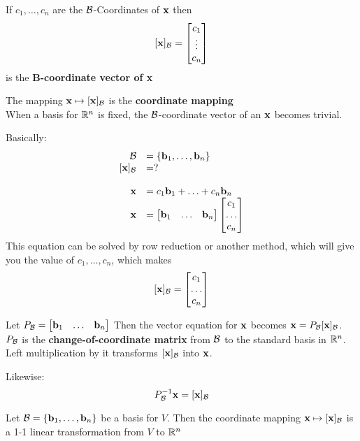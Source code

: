 \documentclass{report}
\begin{document}
If $c_1, \ldots, c_n$ are the $\mathcal{B}$-Coordinates of $\mathbf{x}$ then \[
[\mathbf{x}]_{\mathcal{B}} = \begin{bmatrix}
    c_1 \\ \vdots \\ c_n
\end{bmatrix}
\]
is the \textbf{B-coordinate vector of x}

The mapping $\mathbf{x} \mapsto [\mathbf{x}]_{\mathcal{B}}$ is the \textbf{coordinate mapping}
\\

When a basis for $\mathbb{R}^n$ is fixed, the $\mathcal{B}$-coordinate vector of an $\mathbf{x}$ becomes trivial.

Basically:
\[
\begin{array}{rlr}
    \BB &= \{\bb_1, \ldots, \bb_n\} \\
    \cB &= ?
    \\\\
    \xx &= c_1 \bb_1 + \ldots + c_n \bb_n \\ 
    \xx &= \begin{bmatrix}
        \bb_1 & \ldots & \bb_n
    \end{bmatrix} 
    \begin{bmatrix}
        c_1 \\ \ldots \\ c_n
    \end{bmatrix}
\end{array}
\]
This equation can be solved by row reduction or another method, 
which will give you the value of $c_1, \ldots, c_n$, which makes \[
    [\mathbf{x}]_{\mathcal{B}} = \begin{bmatrix}
        c_1 \\ \ldots \\ c_n
    \end{bmatrix}
\]

Let $P_{\mathcal{B}} = \begin{bmatrix}
    \mathbf{b}_1 & \ldots & \mathbf{b}_n
\end{bmatrix} $
Then the vector equation for $\mathbf{x}$ becomes $\mathbf{x} = P_{\mathcal{B}} [\mathbf{x}]_{\mathcal{B}}$.
$P_{\mathcal{B}}$ is the \textbf{change-of-coordinate matrix} from $\mathcal{B}$ to the standard basis in $\mathbb{R}^n$. Left
multiplication by it transforms $[\mathbf{x}]_{\mathcal{B}}$ into $\mathbf{x}$.


Likewise:\[
P_{\mathcal{B}}^{-1} \mathbf{x} = [\mathbf{x}]_{\mathcal{B}}
\]

\begin{theorem}
    Let $\mathcal{B} = \{\mathbf{b}_1, \ldots, \mathbf{b}_n\}$ be a basis for $V$. Then the coordinate 
    mapping $\mathbf{x} \mapsto [\mathbf{x}]_{\mathcal{B}}$ is a 1-1 linear transformation from $V$ to $\mathbb{R}^n$
\end{theorem}
\end{document}
